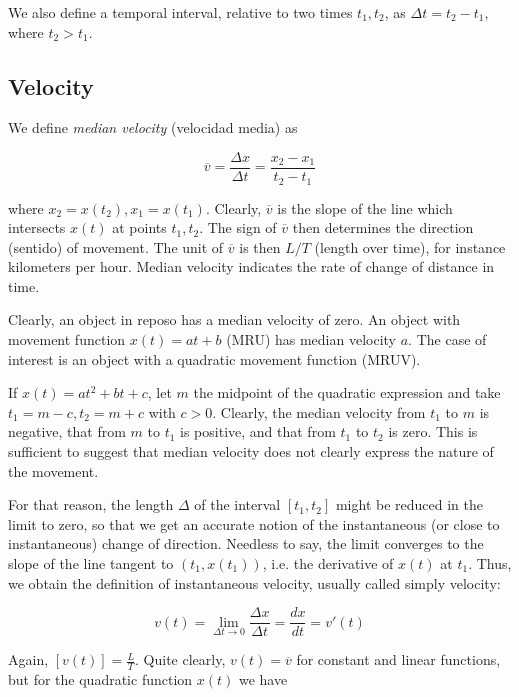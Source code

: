 \documentclass[12pt]{article}
\theoremstyle{definition}
\begin{document}
We also define a temporal interval, relative to two times $t_1, t_2$, as $\Delta
t = t_2 - t_1$, where $t_2 > t_1$. 

\subsection{Velocity}

We define \textit{median velocity} (velocidad media) as 

\begin{equation}
    \overline{v} = \frac{\Delta x}{\Delta t} = \frac{x_2 - x_1}{t_2 - t_1}
\end{equation}

where $x_2 = x(t_2), x_1 = x(t_1)$. Clearly, $\overline{v}$ is the slope of the
line which intersects $x(t)$ at points $t_1, t_2$. The sign of $\overline{v}$
then determines the direction (sentido) of movement. The unit of $\overline{v}$
is then $L / T$ (length over time), for instance kilometers per hour. Median
velocity indicates the rate of change of distance in time.

Clearly, an object in reposo has a median velocity of zero. An object with
movement function $x(t) = at + b$ (MRU) has median velocity $a$. The case of
interest is an object with a quadratic movement function (MRUV).

If $x(t) = at^2 + b t + c$, let $m$ the midpoint of the quadratic expression and 
take $t_1 = m - c, t_2 = m + c$ with $c > 0$. Clearly, the median velocity from 
$t_1$ to $m$ is negative, that from $m$ to $t_1$ is positive, and that from 
$t_1$ to $t_2$ is zero. This is sufficient to suggest that median velocity does
not clearly express the nature of the movement. 

For that reason, the length $\Delta$ of the interval $[t_1, t_2]$ might be
reduced in the limit to zero, so that we get an accurate notion of the
instantaneous (or close to instantaneous) change of direction. Needless to say, 
the limit converges to the slope of the line  tangent to $(t_1, x(t_1))$, i.e.
the derivative of $x(t)$ at $t_1$. Thus, we obtain the definition of
instantaneous velocity, usually called simply velocity: 

\begin{equation}
    v(t) = \lim_{\Delta t \to 0} \frac{\Delta x}{\Delta t} = \frac{dx}{dt} =
    v'(t)
\end{equation}

Again, $\left[ v(t) \right] = \frac{L}{T}$. Quite clearly, $v(t) = \overline{v}$
for constant and linear functions, but for the quadratic function $x(t)$ we
have 
\end{document}
